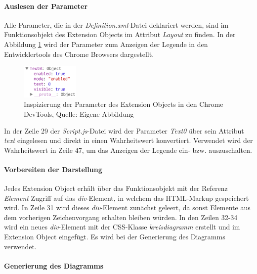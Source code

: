 

\paragraph{Auslesen der Parameter}

Alle Parameter, die in der \textit{Definition.xml}-Datei deklariert werden, sind im Funktionsobjekt des Extension Objects im Attribut \textit{Layout} zu finden. In der Abbildung \ref{fig:InspectLayoutParams} wird der Parameter zum Anzeigen der Legende in den Entwicklertools des Chrome Browsers dargestellt.

\begin{figure}[htbp]
	\centering
		\includegraphics[width=0.25\textwidth]{./img/DevTools/LayoutParams.png}
	\caption[Inspizierung der Parameter des Extension Objects in den Chrome DevTools]{Inspizierung der Parameter des Extension Objects in den Chrome DevTools, Quelle: Eigene Abbildung}
	\label{fig:InspectLayoutParams}
\end{figure}

In der Zeile 29 der \textit{Script.js}-Datei wird der Parameter \textit{Text0} über sein Attribut \textit{text} eingelesen und direkt in einen Wahrheits\-wert konvertiert. Verwendet wird der Wahrheits\-wert in Zeile 47, um das Anzeigen der Legende ein- bzw. auszuschalten.


\paragraph{Vorbereiten der Darstellung}

Jedes Extension Object erhält über das Funktionsobjekt mit der Referenz \textit{Element} Zugriff auf das \textit{div}-Element, in welchem das HTML-Markup gespeichert wird. In Zeile 31 wird dieses \textit{div}-Element zunächst geleert, da sonst Elemente aus dem vorherigen Zeichenvorgang erhalten bleiben würden. In den Zeilen 32-34 wird ein neues \textit{div}-Element mit der CSS-Klasse \textit{kreisdiagramm} erstellt und im Extension Object eingefügt. Es wird bei der Generierung des Diagramms verwendet.


\paragraph{Generierung des Diagramms}
\label{lab:JsQvGenerierungDesDiagramms} 

